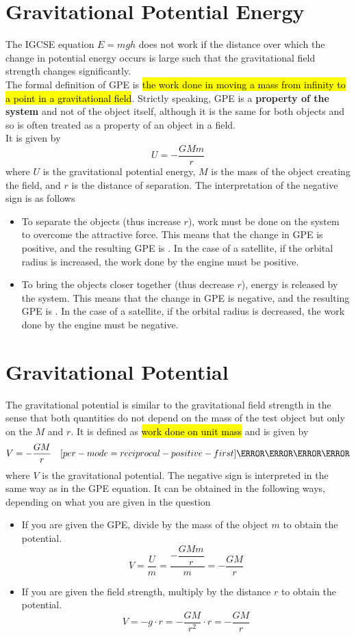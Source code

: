 \documentclass[a4paper,12pt]{article}
\let\oldsection\section
\renewcommand\section{\clearpage\oldsection}
\let\oldsi\si
\renewcommand{\si}[1]{\oldsi[per-mode=reciprocal-positive-first]{#1}}
\newcommand{\lb}{\\[8pt]}
\begin{document}
\section{Gravitational Potential Energy}

The IGCSE equation $E = mgh$ does not work if the distance over which the change in potential energy occurs is large such that the gravitational field strength changes significantly.\lb
The formal definition of GPE is \hl{the work done in moving a mass from infinity to a point in a gravitational field}. Strictly speaking, GPE is a \textbf{property of the system} and not of the object itself, although it is the same for both objects and so is often treated as a property of an object in a field.\lb
It is given by
$$U = -\frac{GMm}{r}$$
where $U$ is the gravitational potential energy, $M$ is the mass of the object creating the field, and $r$ is the distance of separation. The interpretation of the negative sign is as follows
\begin{itemize}
  \item To separate the objects (thus increase $r$), work must be done on the system to overcome the attractive force. This means that the change in GPE is positive, and the resulting GPE is . In the case of a satellite, if the orbital radius is increased, the work done by the engine must be positive.
  \item To bring the objects closer together (thus decrease $r$), energy is released by the system. This means that the change in GPE is negative, and the resulting GPE is . In the case of a satellite, if the orbital radius is decreased, the work done by the engine must be negative.
\end{itemize}

\section{Gravitational Potential}

The gravitational potential is similar to the gravitational field strength in the sense that both quantities do not depend on the mass of the test object but only on the $M$ and $r$. It is defined as \hl{work done on unit mass} and is given by
$$V = -\frac{GM}{r}\quad \si{\J\per\kilo\g}$$
where $V$ is the gravitational potential. The negative sign is interpreted in the same way as in the GPE equation.
It can be obtained in the following ways, depending on what you are given in the question
\begin{itemize}
  \item If you are given the GPE, divide by the mass of the object $m$ to obtain the potential.
        $$V = \frac{U}{m} = \frac{-\dfrac{GMm}{r}}{m} = -\frac{GM}{r}$$
  \item If you are given the field strength, multiply by the distance $r$ to obtain the potential.
        $$V = -g \cdot r = -\frac{GM}{r^2} \cdot r = -\frac{GM}{r}$$
\end{itemize}
\end{document}
